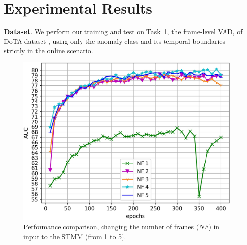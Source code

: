 \section{Experimental Results}
\label{sec:experiments}

\noindent\textbf{Dataset}.
We perform our training and test on Task~1, the frame-level VAD, of DoTA dataset \cite{9712446}, using only the anomaly class and its temporal boundaries, strictly in the online scenario.

\newcommand{\figsize}{0.8\columnwidth}

\begin{figure}[t!]
\centerline{\includegraphics[clip,width=\figsize]{images/exp_1.jpg}}
	\caption{Performance comparison, changing the number of frames ($\mathit{NF}$) in input to the STMM (from 1 to 5).}
	\label{fig:num-frames-vst}
\end{figure}



